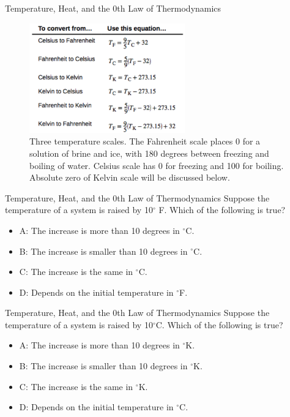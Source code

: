 \documentclass{beamer}
\begin{document}
\begin{frame}{Temperature, Heat, and the 0th Law of Thermodynamics}
\begin{figure}
\centering
\includegraphics[width=0.6\textwidth]{figures/temp2.png}
\caption{\label{fig:temp2} Three temperature scales.  The Fahrenheit scale places 0 for a solution of brine and ice, with 180 degrees between freezing and boiling of water.  Celsius scale has 0 for freezing and 100 for boiling.  Absolute zero of Kelvin scale will be discussed below.}
\end{figure}
\end{frame}

\begin{frame}{Temperature, Heat, and the 0th Law of Thermodynamics}
Suppose the temperature of a system is raised by 10$^{\circ}$ F.  Which of the following is true?
\begin{itemize}
\item A: The increase is more than 10 degrees in $^{\circ}$C.
\item B: The increase is smaller than 10 degrees in $^{\circ}$C.
\item C: The increase is the same in $^{\circ}$C.
\item D: Depends on the initial temperature in $^{\circ}$F.
\end{itemize}
\end{frame}

\begin{frame}{Temperature, Heat, and the 0th Law of Thermodynamics}
Suppose the temperature of a system is raised by 10$^{\circ}$C.  Which of the following is true?
\begin{itemize}
\item A: The increase is more than 10 degrees in $^{\circ}$K.
\item B: The increase is smaller than 10 degrees in $^{\circ}$K.
\item C: The increase is the same in $^{\circ}$K.
\item D: Depends on the initial temperature in $^{\circ}$C.
\end{itemize}
\end{frame}
\end{document}
